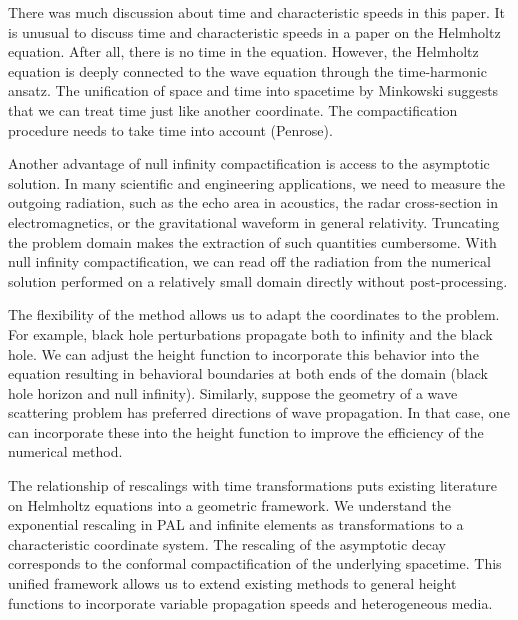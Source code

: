\documentclass[draft,onefignum,onetabnum]{siamart190516}
\begin{document}
There was much discussion about time and characteristic speeds in this paper. It is unusual to discuss time and characteristic speeds in a paper on the Helmholtz equation. After all, there is no time in the equation. However, the Helmholtz equation is deeply connected to the wave equation through the time-harmonic ansatz. The unification of space and time into spacetime by Minkowski suggests that we can treat time just like another coordinate. The compactification procedure needs to take time into account (Penrose).

Another advantage of null infinity compactification is access to the asymptotic solution. In many scientific and engineering applications, we need to measure the outgoing radiation, such as the echo area in acoustics, the radar cross-section in electromagnetics, or the gravitational waveform in general relativity. Truncating the problem domain makes the extraction of such quantities cumbersome. With null infinity compactification, we can read off the radiation from the numerical solution performed on a relatively small domain directly without post-processing. %

The flexibility of the method allows us to adapt the coordinates to the problem. For example, black hole perturbations propagate both to infinity and the black hole. We can adjust the height function to incorporate this behavior into the equation resulting in behavioral boundaries at both ends of the domain (black hole horizon and null infinity)\cite{ZengFramework}. Similarly, suppose the geometry of a wave scattering problem has preferred directions of wave propagation. In that case, one can incorporate these into the height function to improve the efficiency of the numerical method.


The relationship of rescalings with time transformations puts existing literature on Helmholtz equations into a geometric framework. We understand the exponential rescaling in PAL and infinite elements as transformations to a characteristic coordinate system. The rescaling of the asymptotic decay corresponds to the conformal compactification of the underlying spacetime. This unified framework allows us to extend existing methods to general height functions to incorporate variable propagation speeds and heterogeneous media.
 
\end{document}
